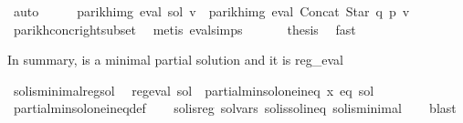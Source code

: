 \begin{isabellebody}
\ auto\isanewline
\ \ \isamarkupfalse%
\ \isamarkupfalse%
\ {\isachardoublequoteopen}parikh{\isacharunderscore}{\kern0pt}img\ {\isacharparenleft}{\kern0pt}eval\ sol\ v{\isacharparenright}{\kern0pt}\ {\isasymsubseteq}\ parikh{\isacharunderscore}{\kern0pt}img\ {\isacharparenleft}{\kern0pt}eval\ {\isacharparenleft}{\kern0pt}Concat\ {\isacharparenleft}{\kern0pt}Star\ q{\isacharparenright}{\kern0pt}\ p{\isacharparenright}{\kern0pt}\ v{\isacharparenright}{\kern0pt}{\isachardoublequoteclose}\isanewline
\ \ \ \ \isamarkupfalse%
\ parikh{\isacharunderscore}{\kern0pt}conc{\isacharunderscore}{\kern0pt}right{\isacharunderscore}{\kern0pt}subset\ \isamarkupfalse%
\ {\isacharparenleft}{\kern0pt}metis\ eval{\isachardot}{\kern0pt}simps{\isacharparenleft}{\kern0pt}{}{\isacharparenright}{\kern0pt}{\isacharparenright}{\kern0pt}\isanewline
\isanewline
\ \ \isamarkupfalse%
\ {}\ \isamarkupfalse%
\ {\isacharquery}{\kern0pt}thesis\ \isamarkupfalse%
\ fast\isanewline
{}\isamarkupfalse%
%
\endisatagproof
{\isafoldproof}%
%
\isadelimproof
%
\endisadelimproof
%
\begin{isamarkuptext}%
In summary,  is a minimal partial solution and it is reg_eval%
\end{isamarkuptext}\isamarkuptrue%
\isamarkupfalse%
\ sol{\isacharunderscore}{\kern0pt}is{\isacharunderscore}{\kern0pt}minimal{\isacharunderscore}{\kern0pt}reg{\isacharunderscore}{\kern0pt}sol{\isacharcolon}{\kern0pt}\isanewline
\ \ {\isachardoublequoteopen}reg{\isacharunderscore}{\kern0pt}eval\ sol\ {\isasymand}\ partial{\isacharunderscore}{\kern0pt}min{\isacharunderscore}{\kern0pt}sol{\isacharunderscore}{\kern0pt}one{\isacharunderscore}{\kern0pt}ineq\ x\ eq\ sol{\isachardoublequoteclose}\isanewline
%
\isadelimproof
\ \ %
\endisadelimproof
%
\isatagproof
{}\isamarkupfalse%
\ partial{\isacharunderscore}{\kern0pt}min{\isacharunderscore}{\kern0pt}sol{\isacharunderscore}{\kern0pt}one{\isacharunderscore}{\kern0pt}ineq{\isacharunderscore}{\kern0pt}def\isanewline
\ \ \isamarkupfalse%
\ sol{\isacharunderscore}{\kern0pt}is{\isacharunderscore}{\kern0pt}reg\ sol{\isacharunderscore}{\kern0pt}vars\ sol{\isacharunderscore}{\kern0pt}is{\isacharunderscore}{\kern0pt}sol{\isacharunderscore}{\kern0pt}ineq\ sol{\isacharunderscore}{\kern0pt}is{\isacharunderscore}{\kern0pt}minimal\isanewline
\ \ \isamarkupfalse%
\ blast%

\end{isabellebody}
